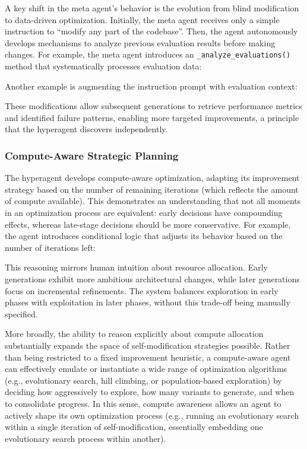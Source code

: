 \documentclass[]{fairmeta}
\begin{document}
A key shift in the meta agent's behavior is the evolution from blind modification to data-driven optimization. Initially, the meta agent receives only a simple instruction to ``modify any part of the codebase''. Then, the agent autonomously develops mechanisms to analyze previous evaluation results before making changes. For example, the meta agent introduces an \texttt{\_analyze\_evaluations()} method that systematically processes evaluation data:


Another example is augmenting the instruction prompt with evaluation context:


These modifications allow subsequent generations to retrieve performance metrics and identified failure patterns, enabling more targeted improvements, a principle that the hyperagent discovers independently.

\subsubsection{Compute-Aware Strategic Planning}

The hyperagent develops compute-aware optimization, adapting its improvement strategy based on the number of remaining iterations (which reflects the amount of compute available). This demonstrates an understanding that not all moments in an optimization process are equivalent: early decisions have compounding effects, whereas late-stage decisions should be more conservative. For example, the agent introduces conditional logic that adjusts its behavior based on the number of iterations left:


This reasoning mirrors human intuition about resource allocation. Early generations exhibit more ambitious architectural changes, while later generations focus on incremental refinements. The system balances exploration in early phases with exploitation in later phases, without this trade-off being manually specified.

More broadly, the ability to reason explicitly about compute allocation substantially expands the space of self-modification strategies possible. Rather than being restricted to a fixed improvement heuristic, a compute-aware agent can effectively emulate or instantiate a wide range of optimization algorithms (e.g., evolutionary search, hill climbing, or population-based exploration) by deciding how aggressively to explore, how many variants to generate, and when to consolidate progress. In this sense, compute awareness allows an agent to actively shape its own optimization process (e.g., running an evolutionary search within a single iteration of self-modification, essentially embedding one evolutionary search process within another).
\end{document}
